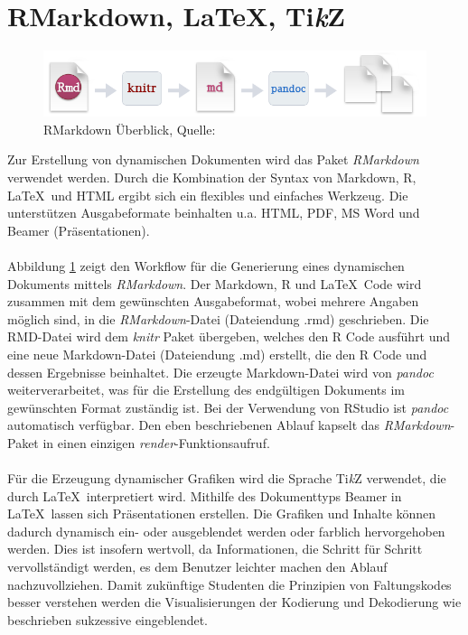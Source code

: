 \section{RMarkdown, \LaTeX, Ti\textit{k}Z}
\label{kapitel:rmarkdown}
\begin{figure}[!t]
\centering
\includegraphics[width=\ScaleIfNeeded]{abbildungen/rmarkdown}
\caption{RMarkdown Überblick, Quelle: \cite{rmarkdown}}
\label{abb:rmarkdown}
\end{figure}
Zur Erstellung von dynamischen Dokumenten wird das Paket \emph{RMarkdown} verwendet werden. Durch die Kombination der Syntax von Markdown, R, \LaTeX\ und HTML ergibt sich ein flexibles und einfaches Werkzeug. Die unterstützen Ausgabeformate beinhalten u.a. HTML, PDF, MS Word und Beamer (Präsentationen).
\\
\\
Abbildung \ref{abb:rmarkdown} zeigt den Workflow für die Generierung eines dynamischen Dokuments mittels \emph{RMarkdown}. Der Markdown, R und \LaTeX\ Code wird zusammen mit dem gewünschten Ausgabeformat, wobei mehrere Angaben möglich sind, in die \emph{RMarkdown}-Datei (Dateiendung .rmd) geschrieben. Die RMD-Datei wird dem \emph{knitr} Paket übergeben, welches den R Code ausführt und eine neue Markdown-Datei (Dateiendung .md) erstellt, die den R Code und dessen Ergebnisse beinhaltet. Die erzeugte Markdown-Datei wird von \emph{pandoc} weiterverarbeitet, was für die Erstellung des endgültigen Dokuments im gewünschten Format zuständig ist. Bei der Verwendung von RStudio ist \emph{pandoc} automatisch verfügbar. Den eben beschriebenen Ablauf kapselt das \emph{RMarkdown}-Paket in einen einzigen \emph{render}-Funktionsaufruf.
\\
\\
Für die Erzeugung dynamischer Grafiken wird die Sprache Ti\textit{k}Z verwendet, die durch \LaTeX\ interpretiert wird. Mithilfe des Dokumenttyps Beamer in \LaTeX\ lassen sich Präsentationen erstellen. Die Grafiken und Inhalte können dadurch dynamisch ein- oder ausgeblendet werden oder farblich hervorgehoben werden. Dies ist insofern wertvoll, da Informationen, die Schritt für Schritt vervollständigt werden, es dem Benutzer leichter machen den Ablauf nachzuvollziehen. Damit zukünftige Studenten die Prinzipien von Faltungskodes besser verstehen werden die Visualisierungen der Kodierung und Dekodierung wie beschrieben sukzessive eingeblendet.